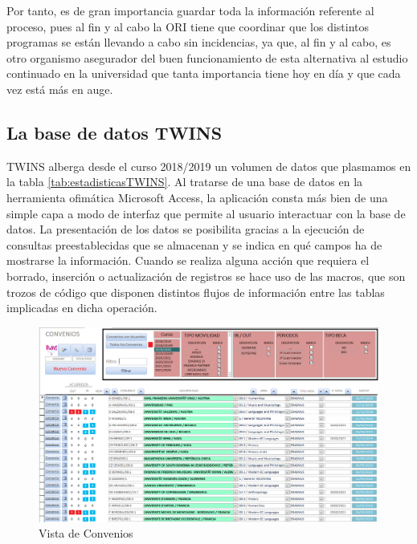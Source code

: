 Por tanto, es de gran importancia guardar toda la información referente al proceso, pues al fin y al cabo la ORI tiene que coordinar que los distintos programas se están llevando a cabo sin incidencias, ya que, al fin y al cabo, es otro organismo asegurador del buen funcionamiento de esta alternativa al estudio continuado en la universidad que tanta importancia tiene hoy en día y que cada vez está más en auge.

\subsection{La base de datos TWINS}


TWINS alberga desde el curso 2018/2019 un volumen de datos que plasmamos en la tabla \ref{tab:estadisticasTWINS}. Al tratarse de una base de datos en la herramienta ofimática Microsoft Access\textregistered, la aplicación consta más bien de una simple capa a modo de interfaz que permite al usuario interactuar con la base de datos. La presentación de los datos se posibilita gracias a la ejecución de consultas preestablecidas que se almacenan y se indica en qué campos ha de mostrarse la información. Cuando se realiza alguna acción que requiera el borrado, inserción o actualización de registros se hace uso de las macros, que son trozos de código que disponen distintos flujos de información entre las tablas implicadas en dicha operación.

\begin{figure}
	\includegraphics[width=\textwidth]{img/Capturas de TWINS/vistaConvenios.png}
	\caption{Vista de Convenios}
	\label{fig:vistaConvenios}
\end{figure}


